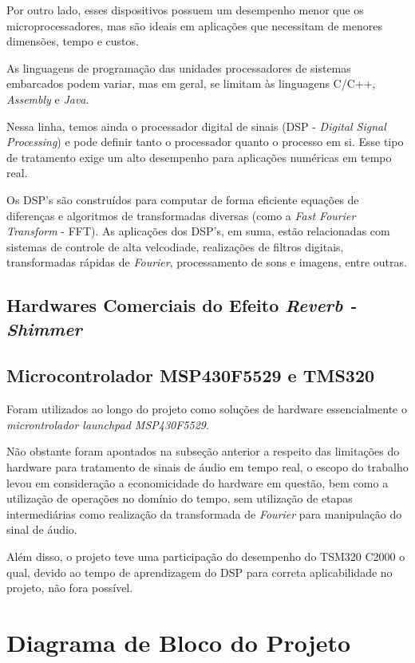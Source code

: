 		Por outro lado, esses dispositivos possuem um desempenho menor que os microprocessadores, mas são ideais em aplicações que necessitam de menores dimensões, tempo e custos.
		
		As linguagens de programação das unidades processadores de sistemas embarcados podem variar, mas em geral, se limitam às linguagens C/C++, \textit{Assembly} e \textit{Java}.
		
		Nessa linha, temos ainda o processador digital de sinais (DSP - \textit{Digital Signal Processing}) e pode definir tanto o processador quanto o processo em si. Esse tipo de tratamento exige um alto desempenho para aplicações numéricas em tempo real.
		
		Os DSP's são construídos para computar de forma eficiente equações de diferenças e algoritmos de transformadas diversas (como a \textit{Fast Fourier Transform} - FFT). As aplicações dos DSP's, em suma, estão relacionadas com sistemas de controle de alta velcodiade, realizações de filtros digitais, transformadas rápidas de \textit{Fourier}, processamento de sons e imagens, entre outras.

	\subsection{Hardwares Comerciais do Efeito \textit{Reverb - Shimmer}}
	
	\subsection{Microcontrolador MSP430F5529 e TMS320}
	
	Foram utilizados ao longo do projeto como soluções de hardware essencialmente o \textit{microntrolador launchpad MSP430F5529}.
	
	Não obstante foram apontados na subseção anterior a respeito das limitações do hardware para tratamento de sinais de áudio em tempo real, o escopo do trabalho levou em consideração a economicidade do hardware em questão, bem como a utilização de operações no domínio do tempo, sem utilização de etapas intermediárias como realização da transformada de \textit{Fourier} para manipulação do sinal de áudio. %
	
	Além disso, o projeto teve uma participação do desempenho do TSM320 C2000 o qual, devido ao tempo de aprendizagem do DSP para correta aplicabilidade no projeto, não fora possível. %


\section{Diagrama de Bloco do Projeto}

